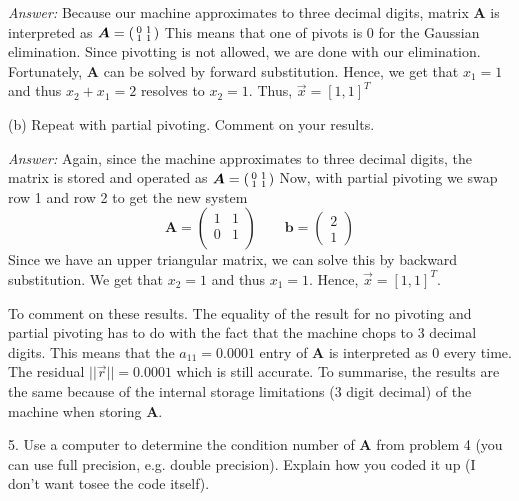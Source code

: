 \documentclass{article}
\begin{document}
    \vspace{0.5cm}
    \textit{Answer:} Because our machine approximates to three decimal digits, matrix $\bm{A}$
    is interpreted as $\bm{A} = \begin{psmallmatrix}
        0 & 1 \\
        1 & 1 \\
    \end{psmallmatrix}$
    This means that one of pivots is 0 for the Gaussian elimination. Since pivotting is not
    allowed, we are done with our elimination. Fortunately, $\bm{A}$ can be solved by
    forward substitution. Hence, we get that $x_1 = 1$ and thus $x_2 + x_1 = 2$ resolves to
    $x_2 = 1$. Thus, $\vec{x} = [1,1]^T$

    \vspace{0.5cm}
    (b) Repeat with partial pivoting. Comment on your results.

    \textit{Answer:} Again, since the machine approximates to three decimal digits,
    the matrix is stored and operated as
    $\bm{A} = \begin{psmallmatrix}
        0 & 1 \\
        1 & 1 \\
    \end{psmallmatrix}$
    Now, with partial pivoting we swap row 1 and row 2 to get the new system
    $$\bm{A}=\begin{pmatrix}
        1 & 1 \\
        0 & 1 \\
    \end{pmatrix} \qquad \bm{b} = \begin{pmatrix}
        2 \\ 1
    \end{pmatrix}$$
    Since we have an upper triangular matrix, we can solve this by backward substitution.
    We get that $x_2 = 1$ and thus $x_1 = 1$. Hence, $\vec{x} = [1,1]^T$.

    To comment on these results. The equality of the result for no pivoting and
    partial pivoting has to do with the fact that the machine chops to 3 decimal digits.
    This means that the $a_{11} = 0.0001$ entry of $\bm{A}$ is interpreted as $0$
    every time. The residual $||\vec{r}|| = 0.0001$ which is still accurate.
    To summarise, the results are the same because of the internal storage
    limitations (3 digit decimal) of the machine when storing $\bm{A}$.

    \vspace{1cm}
    5. Use a computer to determine the condition number of $\bm{A}$ from problem 4 
    (you can use full precision, e.g. double precision).  Explain how you coded it up 
    (I don’t want tosee the code itself).
    
\end{document}
